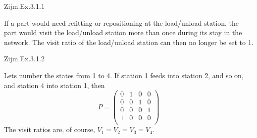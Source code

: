 \begin{comment}
\begin{exercise}
  What if $P$ has an eigenvalue $\alpha$ whose modulus $|\alpha|>$? What if for all eigenvalues $\alpha_i$ we have that $|\alpha_i|<1$?
  \begin{solution}
    TBD.
  \end{solution}
\end{exercise}
\end{comment}

\begin{exercise}
Zijm.Ex.3.1.1 
\begin{solution}
If a part would need refitting or repositioning at the load/unload station, the part would visit the load/unload station more than once during its stay in the network. The visit ratio of the load/unload station can then no longer be set to 1.
\end{solution}
\end{exercise}

\begin{exercise}
Zijm.Ex.3.1.2
\begin{solution}
Lets number the states from 1 to 4. If station 1 feeds into station 2, and so on, and station 4 into station 1, then 
\begin{equation*}
  P = 
  \begin{pmatrix}
    0 & 1 & 0 & 0\\
    0 & 0 & 1 & 0\\
    0 & 0 & 0 & 1\\
    1 & 0 & 0 & 0\\
  \end{pmatrix}
\end{equation*}
The visit ratios are, of course, $V_1= V_2 = V_3 = V_4$. 
\end{solution}
\end{exercise}

